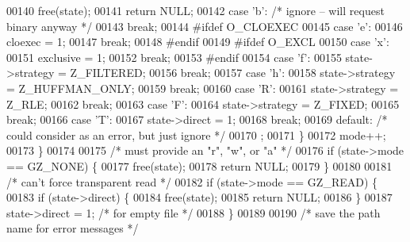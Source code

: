 \begin{DoxyCode}
{00140                 free(state);
00141                 \textcolor{keywordflow}{return} NULL;
00142             \textcolor{keywordflow}{case} \textcolor{charliteral}{'b'}:       \textcolor{comment}{/* ignore -- will request binary anyway */}
00143                 \textcolor{keywordflow}{break};
00144 \textcolor{preprocessor}{#ifdef O\_CLOEXEC}
00145             \textcolor{keywordflow}{case} \textcolor{charliteral}{'e'}:
00146                 cloexec = 1;
00147                 \textcolor{keywordflow}{break};
00148 \textcolor{preprocessor}{#endif}
00149 \textcolor{preprocessor}{#ifdef O\_EXCL}
00150             \textcolor{keywordflow}{case} \textcolor{charliteral}{'x'}:
00151                 exclusive = 1;
00152                 \textcolor{keywordflow}{break};
00153 \textcolor{preprocessor}{#endif}
00154             \textcolor{keywordflow}{case} \textcolor{charliteral}{'f'}:
00155                 state->strategy = Z\_FILTERED;
00156                 \textcolor{keywordflow}{break};
00157             \textcolor{keywordflow}{case} \textcolor{charliteral}{'h'}:
00158                 state->strategy = Z\_HUFFMAN\_ONLY;
00159                 \textcolor{keywordflow}{break};
00160             \textcolor{keywordflow}{case} \textcolor{charliteral}{'R'}:
00161                 state->strategy = Z\_RLE;
00162                 \textcolor{keywordflow}{break};
00163             \textcolor{keywordflow}{case} \textcolor{charliteral}{'F'}:
00164                 state->strategy = Z\_FIXED;
00165                 \textcolor{keywordflow}{break};
00166             \textcolor{keywordflow}{case} \textcolor{charliteral}{'T'}:
00167                 state->direct = 1;
00168                 \textcolor{keywordflow}{break};
00169             \textcolor{keywordflow}{default}:        \textcolor{comment}{/* could consider as an error, but just ignore */}
00170                 ;
00171             \}
00172         mode++;
00173     \}
00174 
00175     \textcolor{comment}{/* must provide an "r", "w", or "a" */}
00176     \textcolor{keywordflow}{if} (state->mode == GZ\_NONE) \{
00177         free(state);
00178         \textcolor{keywordflow}{return} NULL;
00179     \}
00180 
00181     \textcolor{comment}{/* can't force transparent read */}
00182     \textcolor{keywordflow}{if} (state->mode == GZ\_READ) \{
00183         \textcolor{keywordflow}{if} (state->direct) \{
00184             free(state);
00185             \textcolor{keywordflow}{return} NULL;
00186         \}
00187         state->direct = 1;      \textcolor{comment}{/* for empty file */}
00188     \}
00189 
00190     \textcolor{comment}{/* save the path name for error messages */}
}
\end{DoxyCode}
